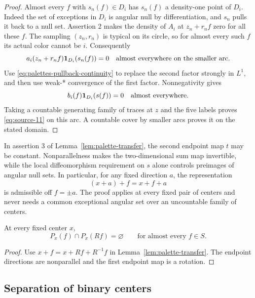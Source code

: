 \begin{proof}
Almost every \(f\) with \(s_n(f)\in D_i\) has \(s_n(f)\) a
density-one point of \(D_i\).  Indeed the set of exceptions in
\(D_i\) is angular null by differentiation, and \(s_n\) pulls
it back to a null set.  Assertion 2 makes the density of \(A_i\)
at \(z_n+r_nf\) zero for all these \(f\).  The sampling
\((z_n,r_n)\) is typical on its circle, so for almost every such
\(f\) its actual color cannot be \(i\).  Consequently
\[
 a_i(z_n+r_nf)\mathbf 1_{D_i}(s_n(f))=0
 \quad\text{almost everywhere on the smaller arc}.
\]
Use \eqref{eq:palettes-pullback-continuity} to replace the second
factor strongly in \(L^1\), and then use weak-* convergence of the
first factor.  Nonnegativity gives
\[
 b_i(f)\mathbf 1_{D_i}(s(f))=0
 \quad\text{almost everywhere}.
\]
Taking a countable generating family of traces at \(z\) and the
five labels proves \eqref{eq:source-11} on this arc.
A countable cover by smaller arcs proves it on the stated domain.
\end{proof}

\begin{remark}\label{rem:palettes-transport-scope}
In assertion 3 of Lemma~\ref{lem:palette-transfer}, the second endpoint
map \(t\) may be constant.  Nonparallelness makes the two-dimensional
sum map invertible, while the local diffeomorphism requirement on
\(s\) alone controls preimages of angular null sets.
In particular, for any fixed direction \(a\), the representation
\[
 (x+a)+f=x+f+a
\]
is admissible off \(f=\pm a\).  The proof applies at every fixed
pair of centers and never needs a common exceptional angular set
over an uncountable family of centers.
\end{remark}

\begin{corollary}
\label{cor:palettes-sixty-degree}
At every fixed center \(x\),
\begin{equation}\label{eq:source-12}
 P_x(f)\cap P_x(Rf)=\varnothing
 \qquad\text{for almost every }f\in S.
\end{equation}
\end{corollary}

\begin{proof}
Use \(x+f=x+Rf+R^{-1}f\) in
Lemma~\ref{lem:palette-transfer}.  The endpoint directions are
nonparallel and the first endpoint map is a rotation.
\end{proof}

\subsection{Separation of binary centers}
\label{subsec:palettes-binary}

